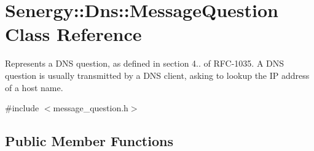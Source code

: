 \hypertarget{class_senergy_1_1_dns_1_1_message_question}{\section{Senergy\-:\-:Dns\-:\-:Message\-Question Class Reference}
\label{class_senergy_1_1_dns_1_1_message_question}
}


Represents a D\-N\-S question, as defined in section 4.. of R\-F\-C-\/1035. A D\-N\-S question is usually transmitted by a D\-N\-S client, asking to lookup the I\-P address of a host name.  




{\ttfamily \#include $<$message\-\_\-question.\-h$>$}

\subsection*{Public Member Functions}
